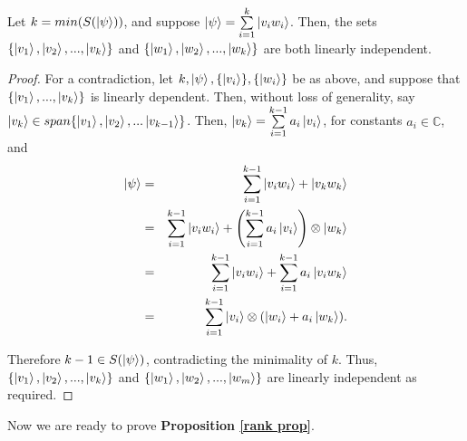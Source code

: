 \begin{lemma}
\label{independence lemma}
Let $k=min (S(\ket{\psi}))$, and suppose $\ket{\psi}=\sum\limits_{i=1}^k \ket{v_iw_i}$.  Then, the sets $\{\ket{v_1}, \ket{v_2},...,\ket{v_k}\}$ and $\{\ket{w_1}, \ket{w_2},...,\ket{w_k}\}$ are both linearly independent.
\end{lemma}

\begin{proof}
For a contradiction, let $k, \ket{\psi}, \{\ket{v_i}\}, \{\ket{w_i}\}$ be as above, and suppose that $\{\ket{v_1}, ...,\ket{v_k}\}$ is linearly dependent. Then, without loss of generality, say $\ket{v_k} \in span\{\ket{v_1}, \ket{v_2},...\ket{v_{k-1}}\}$. Then, $\ket{v_k}=\sum\limits_{i=1}^{k-1} a_i \ket{v_i}$, for constants $a_i \in \mathbb{C}$, and
\begin{eqnarray*}
\ket{\psi}&=&\sum\limits_{i=1}^{k-1} \ket{v_i w_i} + \ket{v_k w_k}\\
&=&\sum_{i=1}^{k-1} \ket{v_i w_i} + \left(\sum_{i=1}^{k-1} a_i\ket{v_i}\right) \otimes \ket{w_k}\\
&=&\sum_{i=1}^{k-1} \ket{v_i w_i} + \sum_{i=1}^{k-1} a_i\ket{v_iw_k}\\
&=&\sum_{i=1}^{k-1} \ket{v_i} \otimes (\ket{w_i}+a_i\ket{w_k}).\\
\end{eqnarray*}

Therefore $k-1 \in S(\ket{\psi})$, contradicting the minimality of $k$.  Thus, $\{\ket{v_1}, \ket{v_2},...,\ket{v_k}\}$ and $\{\ket{w_1}, \ket{w_2},...,\ket{w_m}\}$ are linearly independent as required.
\end{proof}

\bigskip
Now we are ready to prove \textbf{Proposition \ref{rank prop}}.

